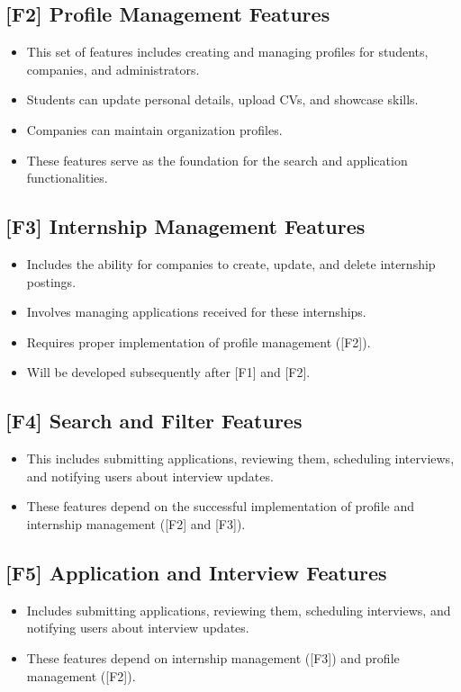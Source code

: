 \subsection{[F2] Profile Management Features}
\begin{itemize}
    \item This set of features includes creating and managing profiles for students, companies, and administrators.
    \item Students can update personal details, upload CVs, and showcase skills.
    \item Companies can maintain organization profiles.
    \item These features serve as the foundation for the search and application functionalities.
\end{itemize}

\subsection{[F3] Internship Management Features}
\begin{itemize}
    \item Includes the ability for companies to create, update, and delete internship postings.
    \item Involves managing applications received for these internships.
    \item Requires proper implementation of profile management ([F2]).
    \item Will be developed subsequently after [F1] and [F2].
\end{itemize}

\subsection{[F4] Search and Filter Features}
\begin{itemize}
    \item This includes submitting applications, reviewing them, scheduling interviews, and notifying users about interview updates.
    
    \item These features depend on the successful implementation of profile and internship management ([F2] and [F3]).
\end{itemize}

\subsection{[F5] Application and Interview Features}
\begin{itemize}
    \item Includes submitting applications, reviewing them, scheduling interviews, and notifying users about interview updates.
    \item These features depend on internship management ([F3]) and profile management ([F2]).
\end{itemize}

